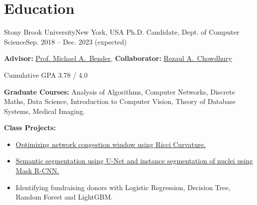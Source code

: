 \documentclass[letterpaper,10pt]{article}
\begin{document}
\section*{Education}
\resumeSubHeadingListStart
\resumeSubheading
{Stony Brook University}{New York, USA}
{Ph.D. Candidate, Dept. of Computer Science}{Sep. 2018 -- Dec. 2023 (expected)}
\resumeItemListStart
\item \textbf{Advisor:} \href{https://www3.cs.stonybrook.edu/~bender/}{Prof. Michael A.\ Bender}, \textbf{Collaborator:} \href{https://www3.cs.stonybrook.edu/~rezaul/}{Rezaul A.\ Chowdhury}
\item Cumulative GPA 3.78 / 4.0
\item \textbf{Graduate Courses:} Analysis of Algorithms, Computer Networks, Discrete Maths, Data Science, Introduction to Computer Vision, Theory of Database Systems, Medical Imaging.
\item \textbf{Class Projects:} 
\begin{itemize}
    \item \href{https://github.com/ArghyaB118/network_curvature/blob/master/Text/project_534.pdf}{Optimizing network congestion window using Ricci Curvature.}
    \item \href{https://github.com/ArghyaB118/Image_Segmentation/blob/main/Project_CSE527/Final_Report.pdf}{Semantic segmentation using U-Net and instance segmentation of nuclei using Mask R-CNN.}
    \item {Identifying fundraising donors with Logistic Regression, Decision Tree, Random Forest and LightGBM.}
\end{itemize}
\resumeItemListEnd
\end{document}
